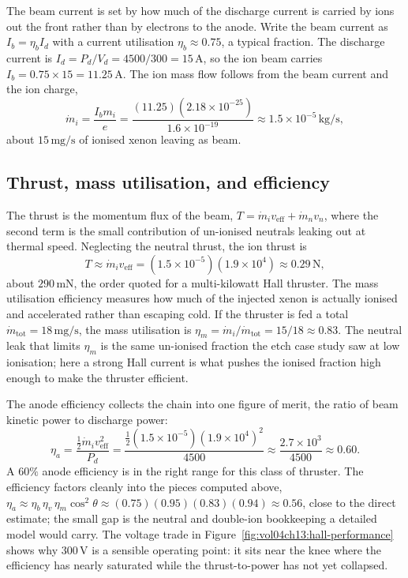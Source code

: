 The beam current is set by how much of the discharge current is carried by
ions out the front rather than by electrons to the anode. Write the beam
current as $I_{b} = \eta_{b}I_{d}$ with a current utilisation $\eta_{b}
\approx 0.75$, a typical fraction. The discharge current is $I_{d} =
P_{d}/V_{d} = 4500/300 = 15\,\si{\ampere}$, so the ion beam carries $I_{b} =
0.75\times 15 = 11.25\,\si{\ampere}$. The ion mass flow follows from the
beam current and the ion charge,
\[
\dot{m}_{i} = \frac{I_{b}m_{i}}{e}
= \frac{(11.25)(2.18\times 10^{-25})}{1.6\times 10^{-19}}
\approx 1.5\times 10^{-5}\,\si{\kilogram\per\second},
\]
about $15\,\si{\milli\gram\per\second}$ of ionised xenon leaving as beam.

\subsection{Thrust, mass utilisation, and efficiency}

The thrust is the momentum flux of the beam, $T = \dot{m}_{i}v_{\mathrm{eff}}
+ \dot{m}_{n}v_{n}$, where the second term is the small contribution of
un-ionised neutrals leaking out at thermal speed. Neglecting the neutral
thrust, the ion thrust is
\[
T \approx \dot{m}_{i}v_{\mathrm{eff}}
= (1.5\times 10^{-5})(1.9\times 10^{4})
\approx 0.29\,\si{\newton},
\]
about $290\,\si{\milli\newton}$, the order quoted for a multi-kilowatt Hall
thruster. The mass utilisation efficiency measures how much of the injected
xenon is actually ionised and accelerated rather than escaping cold. If the
thruster is fed a total $\dot{m}_{\mathrm{tot}} = 18\,\si{\milli\gram\per
\second}$, the mass utilisation is $\eta_{m} = \dot{m}_{i}/\dot{m}_{\mathrm{
tot}} = 15/18 \approx 0.83$. The neutral leak that limits $\eta_{m}$ is the
same un-ionised fraction the etch case study saw at low ionisation; here a
strong Hall current is what pushes the ionised fraction high enough to make
the thruster efficient.

The anode efficiency collects the chain into one figure of merit, the ratio
of beam kinetic power to discharge power:
\[
\eta_{a} = \frac{\tfrac12\dot{m}_{i}v_{\mathrm{eff}}^{2}}{P_{d}}
= \frac{\tfrac12(1.5\times 10^{-5})(1.9\times 10^{4})^{2}}{4500}
\approx \frac{2.7\times 10^{3}}{4500} \approx 0.60.
\]
A $60\%$ anode efficiency is in the right range for this class of thruster.
The efficiency factors cleanly into the pieces computed above, $\eta_{a}
\approx \eta_{b}\,\eta_{v}\,\eta_{m}\cos^{2}\theta \approx (0.75)(0.95)(0.83)
(0.94) \approx 0.56$, close to the direct estimate; the small gap is the
neutral and double-ion bookkeeping a detailed model would carry. The voltage
trade in Figure~\ref{fig:vol04ch13:hall-performance} shows why $300\,\si{
\volt}$ is a sensible operating point: it sits near the knee where the
efficiency has nearly saturated while the thrust-to-power has not yet
collapsed.

